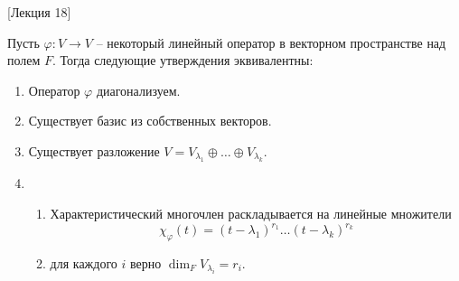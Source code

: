 [Лекция 18]


\begin{claim}
\label{claim::DiagCrit}
Пусть $\varphi\colon V\to V$ -- некоторый линейный оператор в векторном пространстве над полем $F$.
Тогда следующие утверждения эквивалентны:
\begin{enumerate}
\item Оператор $\varphi$ диагонализуем.

\item Существует базис из собственных векторов.

\item Существует разложение $V = V_{\lambda_1}\oplus \ldots \oplus V_{\lambda_k}$.

\item 
\begin{enumerate}
\item Характеристический многочлен раскладывается на линейные множители 
\[
\chi_{\varphi}(t) = (t - \lambda_1)^{r_1} \ldots (t - \lambda_k)^{r_k}
\]

\item для каждого $i$ верно $\dim_F V_{\lambda_i} = r_i$.
\end{enumerate}
\end{enumerate}
\end{claim}
